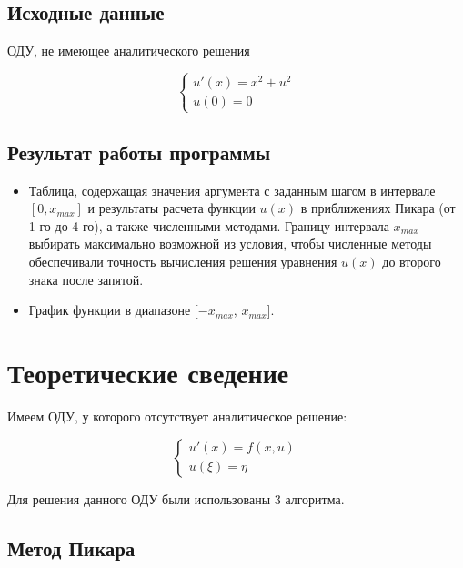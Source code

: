 \documentclass[a4paper,14pt, unknownkeysallowed]{extreport}
\begin{document}
\section{Исходные данные}

ОДУ, не имеющее аналитического решения

\begin{equation}
	{\begin{cases}
			u'(x) = x^2 + u^2 \\
			u(0) = 0
		\end{cases}}
		\label{eq:ref0}
\end{equation}

\section{Результат работы программы}

\begin{itemize}
	\item Таблица, содержащая значения аргумента с заданным шагом в интервале $[0, x_{max}]$ и результаты расчета функции $u(x)$ в приближениях Пикара (от 1-го до 4-го), а также
	численными методами. Границу интервала $x_{max}$ выбирать максимально возможной из условия, чтобы численные методы обеспечивали точность вычисления решения уравнения
	$u(x)$ до второго знака после запятой.
	\item График функции в диапазоне [$-x_{max}$,  $x_{max}$].
\end{itemize}



\chapter{Теоретические сведение}

Имеем ОДУ, у которого отсутствует аналитическое решение:

\begin{equation}
	{\begin{cases}
			u'(x) = f(x,u) \\
			u(\xi) = \eta
		\end{cases}}
		\label{eq:ref1}
\end{equation}

Для решения данного ОДУ были использованы 3 алгоритма.

\section{Метод Пикара}
\end{document}
